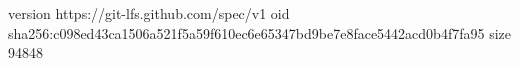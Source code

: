 version https://git-lfs.github.com/spec/v1
oid sha256:c098ed43ca1506a521f5a59f610ec6e65347bd9be7e8face5442acd0b4f7fa95
size 94848
